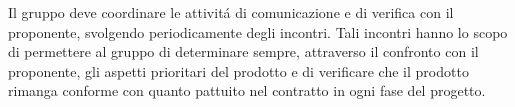 Il gruppo deve coordinare le attivit\'a di comunicazione e di verifica con il proponente, svolgendo periodicamente degli incontri. Tali incontri hanno lo scopo di permettere al gruppo di determinare sempre, attraverso il confronto con il proponente, gli aspetti prioritari del prodotto e di verificare che il prodotto rimanga conforme con quanto pattuito nel contratto in ogni fase del progetto.